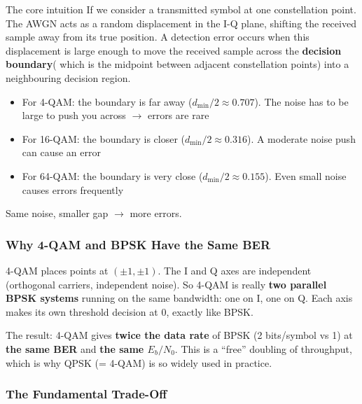 \begin{IntuitionBox}{The core intuition}
If we consider a transmitted symbol at one constellation point. The AWGN acts as a random displacement in the I-Q plane, shifting the received sample away from its true position. A detection error occurs when this displacement is large enough to move the received sample across the \textbf{decision boundary}( which is the midpoint between adjacent constellation points) into a neighbouring decision region.

\begin{itemize}
\item For 4-QAM: the boundary is far away ($d_{\min}/2 \approx 0.707$). The noise has to be large to push you across $\rightarrow$ errors are rare
\item For 16-QAM: the boundary is closer ($d_{\min}/2 \approx 0.316$). A moderate noise push can cause an error
\item For 64-QAM: the boundary is very close ($d_{\min}/2 \approx 0.155$). Even small noise causes errors frequently
\end{itemize}

Same noise, smaller gap $\rightarrow$ more errors.
\end{IntuitionBox}

\subsubsection{Why 4-QAM and BPSK Have the Same BER}

4-QAM places points at $(\pm 1, \pm 1)$. The I and Q axes are independent (orthogonal carriers, independent noise). So 4-QAM is really \textbf{two parallel BPSK systems} running on the same bandwidth: one on I, one on Q. Each axis makes its own threshold decision at $0$, exactly like BPSK.

The result: 4-QAM gives \textbf{twice the data rate} of BPSK (2 bits/symbol vs 1) at \textbf{the same BER} and \textbf{the same $E_b/N_0$}. This is a ``free'' doubling of throughput, which is why QPSK (= 4-QAM) is so widely used in practice.

\subsubsection{The Fundamental Trade-Off}

